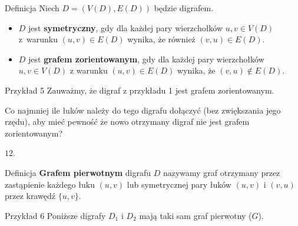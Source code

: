 \documentclass[a4paper,10pt]{beamer}
\begin{document}
\begin{frame}
\begin{block}{Definicja}
Niech $D=(V(D),E(D))$ będzie digrafem.
\begin{itemize}
\item $D$ jest {\bf symetryczny}, gdy dla każdej pary wierzchołków $u,v\in V(D)$ z~warunku $(u,v)\in E(D)$ wynika, że również $(v,u)\in E(D)$.
\item $D$ jest {\bf grafem zorientowanym}, gdy dla każdej pary wierzchołków $u,v\in V(D)$ z warunku $(u,v)\in E(D)$ wynika, że $(v,u)\not\in E(D)$.
\end{itemize}
\end{block}

\medskip

\begin{exampleblock}{Przykład 5}
Zauważmy, że digraf z przykładu 1 jest grafem zorientowanym.

\medskip

Co najmniej ile łuków należy do tego digrafu dołączyć (bez zwiększania jego rzędu), aby mieć pewność że nowo otrzymany digraf nie jest grafem zorientowanym?

\medskip

$12$.
\end{exampleblock}

\end{frame}




\begin{frame}

\begin{block}{Definicja}
{\bf Grafem pierwotnym} digrafu $D$ nazywamy graf otrzymany przez zastąpienie każdego łuku $(u,v)$ lub symetrycznej pary łuków $(u,v)$ i $(v,u)$ przez krawędź $\{u,v\}$.
\end{block}


\begin{exampleblock}{Przykład 6}
Poniższe digrafy $D_1$ i $D_2$ mają taki sam graf pierwotny ($G$).

\begin{center}

\end{center}

\end{exampleblock}

\end{frame}
\end{document}
